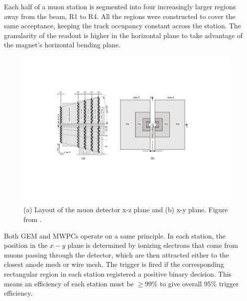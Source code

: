 
Each half of a muon station is segmented into four increasingly larger regions away from the beam, R1 to R4.
 All the regions were constructed to cover the same acceptance, keeping the track occupancy constant across the station. The granularity of the readout is higher in the horizontal plane to take advantage of the magnet's horizontal bending plane.




\begin{figure}[!h]
	\centering
	\includegraphics[width = 1.0\textwidth]{figs/detector/sideview.pdf}%
	\caption{(a) Layout of the muon detector x-z plane and (b) x-y plane. Figure from \cite{LHCb-DP-2012-002}. }  
	\label{fig:MuonGran}
\end{figure}

Both GEM and \Gls{MWPCs} operate on a same principle. In each station, the position in the $x-y$ plane is determined by ionizing electrons that come from muons passing through the detector, which are then attracted either to the closest anode mesh or wire mesh. The trigger is fired if the corresponding rectangular region in each station registered a positive binary decision. This means an efficiency of each station must be $\geq$99\% to give overall 95\% trigger efficiency. %


